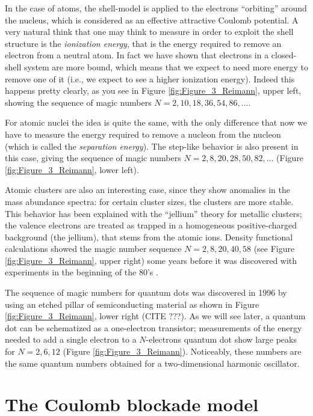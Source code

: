 \documentclass[a4paper,twoside,11pt]{book}
\begin{document}
In the case of atoms, the shell-model is applied to the electrons ``orbiting'' around the nucleus, which is considered as an effective attractive Coulomb potential. A very natural think that one may think to measure in order to exploit the shell structure is the \emph{ionization energy}, that is the energy required to remove an electron from a neutral atom. In fact we have shown that electrons in a closed-shell system are more bound, which means that we expect to need more energy to remove one of it (i.e., we expect to see a higher ionization energy). Indeed this happens pretty clearly, as you see in Figure \ref{fig:Figure_3_Reimann}, upper left, showing the sequence of magic numbers $N=2,10,18,36,54,86,\ldots$.

For atomic nuclei the idea is quite the same, with the only difference that now we have to measure the energy required to remove a nucleon from the nucleon (which is called the \emph{separation energy}). The step-like behavior is also present in this case, giving the sequence of magic numbers $N=2,8,20,28,50,82,\ldots$ (Figure \ref{fig:Figure_3_Reimann}, lower left).

Atomic clusters are also an interesting case, since they show anomalies in the mass abundance spectra: for certain cluster sizes, the clusters are more stable. This behavior has been explained with the ``jellium'' theory for metallic clusters; the valence electrons are treated as trapped in a homogeneous positive-charged background (the jellium), that stems from the atomic ions. Density functional calculations showed the magic number sequence $N=2,8,20,40,58$ (see Figure \ref{fig:Figure_3_Reimann}, upper right) some years before it was discovered with experiments in the beginning of the 80's \citep[see][]{Reimann2002}.

The sequence of magic numbers for quantum dots was discovered in 1996 by using an etched pillar of semiconducting material as shown in Figure \ref{fig:Figure_3_Reimann}, lower right (CITE \cite{Tarucha1996} ???). As we will see later, a quantum dot can be schematized as a one-electron transistor; measurements of the energy needed to add a single electron to a $N$-electrons quantum dot show large peaks for $N=2,6,12$ (Figure \ref{fig:Figure_3_Reimann}). Noticeably, these numbers are the same quantum numbers obtained for a two-dimensional harmonic oscillator.

\section{The Coulomb blockade model}
\end{document}
